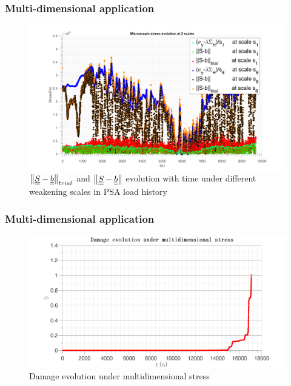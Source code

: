\documentclass[xcolor=table]{Bredelebeamer}
\begin{document}
\begin{frame}
	\frametitle{Multi-dimensional application}
\begin{figure}[!h]
	\centering
	\includegraphics[width=\textwidth]{figures//trialreal3d.png} 
	\caption{$\left\| \uline{\uline{S}}-\uline{\uline{b}}\right\|_{trial}$ and $\left\| \uline{\uline{S}}-\uline{\uline{b}}\right\|$ evolution with time under different weakening scales in PSA load history}
	\label{trialreal3d2}
\end{figure} 
\end{frame}	
\begin{frame}
	\frametitle{Multi-dimensional application}
\begin{figure}[!h]
	\centering
	\includegraphics[width=\textwidth]{figures//damage3d2.png} 
	\caption{Damage evolution under multidimensional stress}
	\label{dam3d}
\end{figure}
\end{frame}	
\end{document}
